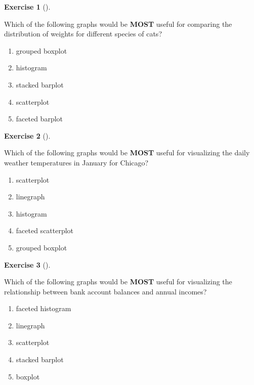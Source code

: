 \documentclass[
  letterpaper,
  DIV=11,
  numbers=noendperiod]{scrreprt}
\providecommand{\tightlist}{%
  \setlength{\itemsep}{0pt}\setlength{\parskip}{0pt}}\usepackage{longtable,booktabs,array}
\theoremstyle{definition}
\newtheorem{exercise}{Exercise}[chapter]
\theoremstyle{remark}
\begin{document}
\leavevmode{}%
\begin{exercise}[]\label{exr-ch02-c06}

Which of the following graphs would be \textbf{MOST} useful for
comparing the distribution of weights for different species of cats?

\begin{enumerate}
\def\labelenumi{\alph{enumi})}
\tightlist
\item
  grouped boxplot
\item
  histogram
\item
  stacked barplot
\item
  scatterplot
\item
  faceted barplot
\end{enumerate}

\end{exercise}

\leavevmode{}%
\begin{exercise}[]\label{exr-ch02-c07}

Which of the following graphs would be \textbf{MOST} useful for
visualizing the daily weather temperatures in January for Chicago?

\begin{enumerate}
\def\labelenumi{\alph{enumi})}
\tightlist
\item
  scatterplot
\item
  linegraph
\item
  histogram
\item
  faceted scatterplot
\item
  grouped boxplot
\end{enumerate}

\end{exercise}

\leavevmode{}%
\begin{exercise}[]\label{exr-ch02-c08}

Which of the following graphs would be \textbf{MOST} useful for
visualizing the relationship between bank account balances and annual
incomes?

\begin{enumerate}
\def\labelenumi{\alph{enumi})}
\tightlist
\item
  faceted histogram
\item
  linegraph
\item
  scatterplot
\item
  stacked barplot
\item
  boxplot
\end{enumerate}

\end{exercise}
\end{document}
